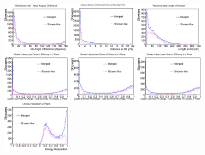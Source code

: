 \begin{figure}[htbp]
\begin{center}
\includegraphics[width=0.3\textwidth]{figs/ongoing/gamma/AngleDiff.eps}
\includegraphics[width=0.3\textwidth]{figs/ongoing/gamma/StartingPointAcc.eps}
\includegraphics[width=0.3\textwidth]{figs/ongoing/gamma/Length.eps}
\includegraphics[width=0.3\textwidth]{figs/ongoing/gamma/ClusterEffU.eps}
\includegraphics[width=0.3\textwidth]{figs/ongoing/gamma/ClusterEffV.eps}
\includegraphics[width=0.3\textwidth]{figs/ongoing/gamma/ClusterEffY.eps}
\includegraphics[width=0.3\textwidth]{figs/ongoing/gamma/EnergyResU.eps}

\end{center}
\end{figure}
